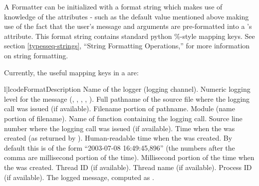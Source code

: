 A Formatter can be initialized with a format string which makes use of
knowledge of the  attributes - such as the default value
mentioned above making use of the fact that the user's message and
arguments are pre-formatted into a 's 
attribute.  This format string contains standard python \%-style
mapping keys. See section \ref{typesseq-strings}, ``String Formatting
Operations,'' for more information on string formatting.

Currently, the useful mapping keys in a  are:

\begin{tableii}{l|l}{code}{Format}{Description}
     {Name of the logger (logging channel).}
  {Numeric logging level for the message
                        (, ,
                        , ,
                        ).}
 {Full pathname of the source file where the logging
                        call was issued (if available).}
 {Filename portion of pathname.}
   {Module (name portion of filename).}
 {Name of function containing the logging call.}
   {Source line number where the logging call was issued
                        (if available).}
  {Time when the  was created (as
                        returned by ).}
  {Human-readable time when the 
                        was created.  By default this is of the form
                        ``2003-07-08 16:49:45,896'' (the numbers after the
                        comma are millisecond portion of the time).}
    {Millisecond portion of the time when the
                         was created.}
   {Thread ID (if available).}
   {Thread name (if available).}
  {Process ID (if available).}
  {The logged message, computed as .}
\end{tableii}


